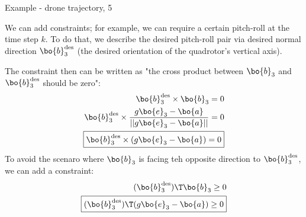 \begin{frame}{Example - drone trajectory, 5}
	\begin{flushleft}
		
		{\small 
		We can add constraints; for example, we can require a certain pitch-roll at the time step $k$. To do that, we describe the desired pitch-roll pair via desired normal direction $\bo{b}_3^\text{des}$ (the desired orientation of the quadrotor's vertical axis). 
		
		The constraint then can be written as "the cross product between $\bo{b}_3$ and $\bo{b}_3^\text{des}$ should be zero":
		\begin{align}
			\bo{b}_3^\text{des} \times \bo{b}_3 = 0
			\\
			\bo{b}_3^\text{des} \times   \frac{g \bo{e}_3 - \bo{a}}{||g \bo{e}_3 - \bo{a}||} = 0
			\\
			\boxed{
			\bo{b}_3^\text{des} \times (g \bo{e}_3 - \bo{a}) = 0
		}
		\end{align} 
		To avoid the scenaro where $\bo{b}_3$ is facing teh opposite direction to $\bo{b}_3^\text{des}$, we can add a constraint:
		\begin{align}
			(\bo{b}_3^\text{des} )\T  \bo{b}_3 \geq 0
			\\
			\boxed{
				(\bo{b}_3^\text{des} )\T (g \bo{e}_3 - \bo{a}) \geq 0
			}
		\end{align} 
		
	}
	\end{flushleft}
\end{frame}



